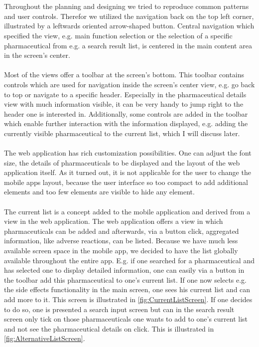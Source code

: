 \\
\\
Throughout the planning and designing we tried to reproduce common patterns and user controls. Therefor we utilized the navigation back on the top left corner, illustrated by a leftwards oriented arrow-shaped button. Central navigation which specified the view, e.g. main function selection or the selection of a specific pharmaceutical from e.g. a search result list, is centered in the main content area in the screen's center.
\\
\\
Most of the views offer a toolbar at the screen's bottom. This toolbar contains controls which are used for navigation inside the screen's center view, e.g. go back to top or navigate to a specific header. Especially in the pharmaceutical details view with much information visible, it can be very handy to jump right to the header one is interested in. Additionally, some controls are added in the toolbar which enable further interaction with the information displayed, e.g. adding the currently visible pharmaceutical to the current list, which I will discuss later.
\\
\\
The web application has rich customization possibilities. One can adjust the font size, the details of pharmaceuticals to be displayed and the layout of the web application itself. As it turned out, it is not applicable for the user to change the mobile apps layout, because the user interface so too compact to add additional elements and too few elements are visible to hide any element.
\\
\\
The current list is a concept added to the mobile application and derived from a view in the web application. The web application offers a view in which pharmaceuticals can be added and afterwards, via a button click, aggregated information, like adverse reactions, can be listed. Because we have much less available screen space in the mobile app, we decided to have the list globally available throughout the entire app. E.g. if one searched for a pharmaceutical and has selected one to display detailed information, one can easily via a button in the toolbar add this pharmaceutical to one's current list. If one now selects e.g. the side effects functionality in the main screen, one sees his current list and can add more to it. This screen is illustrated in \ref{fig:CurrentListScreen}. If one decides to do so, one is presented a search input screen but can in the search result screen only tick on those pharmaceuticals one wants to add to one's current list and not see the pharmaceutical details on click. This is illustrated in \ref{fig:AlternativeListScreen}.
